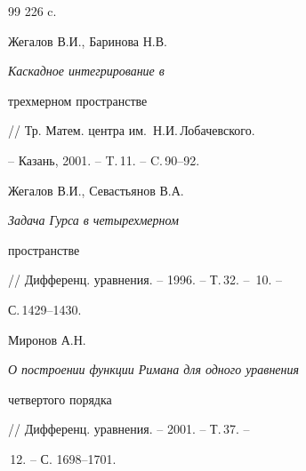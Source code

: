 \begin{thebibliography}{99}
226 c.




Жегалов В.И., Баринова Н.В. {\it Каскадное интегрирование в


трехмерном пространстве} // Тр. Матем. центра им.~Н.И.\,Лобачевского.


-- Казань, 2001. -- T.\,11. -- C.\,90--92.




Жегалов В.И., Севастьянов В.А. {\it Задача Гурса в четырехмерном


пространстве} // Дифференц. уравнения. -- 1996. -- Т.\,32. -- \No\,10. --


С.\,1429--1430.




Миронов А.Н. {\it О построении функции Римана для одного уравнения


четвертого порядка} // Дифференц. уравнения. -- 2001. -- Т.\,37. --


\No\,12. -- С. 1698--1701.





\end{thebibliography}





\vskip 2cm












\label{end}





